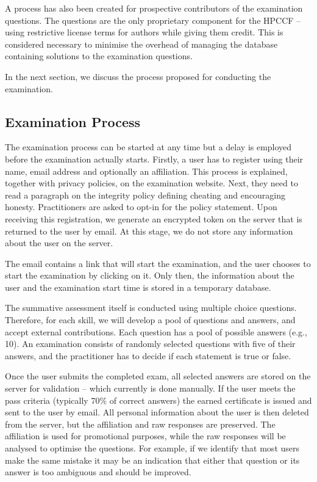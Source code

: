 \documentclass[jocse]{jocseart}
\begin{document}
A process has also been created for prospective contributors of the examination questions.
The questions are the only proprietary component for the HPCCF -- using restrictive license terms for authors while giving them credit. 
This is considered necessary to minimise the overhead of managing the database containing solutions to the examination questions. 

In the next section, we discuss the process proposed for conducting the examination.

\subsection{Examination Process}

The examination process can be started at any time but a delay is employed before the examination actually starts.
Firstly, a user has to register using their name, email address and optionally an affiliation.
This process is explained, together with privacy policies, on the examination website. 
Next, they need to read a paragraph on the integrity policy defining cheating and encouraging honesty.
Practitioners are asked to opt-in for the policy statement.
Upon receiving this registration, we generate an encrypted token on the server that is returned to the user by email.
At this stage, we do not store any information about the user on the server.

The email contains a link that will start the examination, and the user chooses to start the examination by clicking on it. Only then, the information about the user and the examination start time is stored in a temporary database.

The summative assessment itself is conducted using multiple choice questions. 
Therefore, for each skill, we will develop a pool of questions and answers, and accept external contributions.
Each question has a pool of possible answers (e.g., 10). An examination consists of randomly selected questions with five of their answers, and the practitioner has to decide if each statement is true or false.

Once the user submits the completed exam, all selected answers are stored on the server for validation -- which currently is done manually.
If the user meets the pass criteria (typically 70\% of correct answers) the earned certificate is issued and sent to the user by email.
All personal information about the user is then deleted from the server, but the affiliation and raw responses are preserved.
The affiliation is used for promotional purposes, while the raw responses will be analysed to optimise the questions.
For example, if we identify that most users make the same mistake it may be an indication that either that question or its answer is too ambiguous and should be improved.
\end{document}
